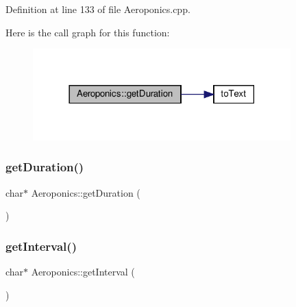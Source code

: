Definition at line 133 of file Aeroponics.\+cpp.

Here is the call graph for this function\+:
\nopagebreak
\begin{figure}[H]
\begin{center}
\leavevmode
\includegraphics[width=282pt]{class_aeroponics_acd7c1402fad8a71c4f0ee4b15f27497d_cgraph}
\end{center}
\end{figure}
\mbox{\label{class_aeroponics_ae884337e59b46b5ff0fdb3b5da5dc5a0}} 
\subsubsection{\texorpdfstring{get\+Duration()}{getDuration()}\hspace{0.1cm}{\footnotesize\ttfamily [2/2]}}
{\footnotesize\ttfamily char$\ast$ Aeroponics\+::get\+Duration (\begin{DoxyParamCaption}{ }\end{DoxyParamCaption})}

\mbox{\label{class_aeroponics_a8b412b9988ce3ceae617dc53502e6d12}} 
\subsubsection{\texorpdfstring{get\+Interval()}{getInterval()}\hspace{0.1cm}{\footnotesize\ttfamily [1/2]}}
{\footnotesize\ttfamily char$\ast$ Aeroponics\+::get\+Interval (\begin{DoxyParamCaption}{ }\end{DoxyParamCaption})}

\mbox{\label{class_aeroponics_af5c051ee5e24b10644d70d5e5a2b82b7}} 
